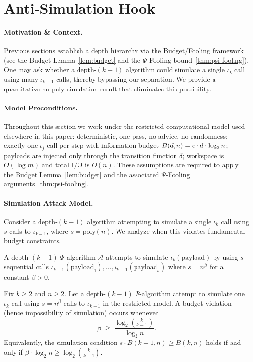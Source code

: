 \section{Anti-Simulation Hook}
\label{AntiSim:sec:hook}

\paragraph{Motivation \& Context.}
Previous sections establish a depth hierarchy via the Budget/Fooling framework (see the Budget Lemma~\ref{lem:budget} and the $\Psi$-Fooling bound~\ref{thm:psi-fooling}). One may ask whether a depth-$(k{-}1)$ algorithm could simulate a single $\iota_k$ call using many $\iota_{k-1}$ calls, thereby bypassing our separation. We provide a quantitative no-poly-simulation result that eliminates this possibility.

\paragraph{Model Preconditions.}
Throughout this section we work under the restricted computational model used elsewhere in this paper:
deterministic, one-pass, no-advice, no-randomness; exactly one $\iota_j$ call per step with information budget $\B(d,n)=c \cdot d \cdot \log_{2} n$; payloads are injected only through the transition function $\delta$; workspace is $O(\log m)$ and total I/O is $O(n)$. These assumptions are required to apply the Budget Lemma~\ref{lem:budget} and the associated $\Psi$-Fooling arguments~\ref{thm:psi-fooling}.

\paragraph{Simulation Attack Model.}
Consider a depth-\((k{-}1)\) algorithm attempting to simulate a single $\iota_k$ call using $s$ calls to $\iota_{k-1}$, where $s = \text{poly}(n)$. We analyze when this violates fundamental budget constraints.

\begin{definition}
\label{AntiSim:def:simulation}
A depth-\((k{-}1)\) $\Psi$-algorithm $\mathcal{A}$ attempts to simulate $\iota_k(\text{payload})$ by using $s$ sequential calls $\iota_{k-1}(\text{payload}_1),\ldots,\iota_{k-1}(\text{payload}_s)$ where $s = n^\beta$ for a constant $\beta > 0$.
\end{definition}

\begin{theorem}
\label{AntiSim:thm:no-poly-sim}
Fix $k \geq 2$ and $n \geq 2$. Let a depth-\((k{-}1)\) $\Psi$-algorithm attempt to simulate one $\iota_k$ call using $s = n^\beta$ calls to $\iota_{k-1}$ in the restricted model. A budget violation (hence impossibility of simulation) occurs whenever
\[
  \beta \;\geq\; \frac{\log_{2}\!\left(\tfrac{k}{k-1}\right)}{\log_{2} n}.
\]
Equivalently, the simulation condition $s\cdot B(k{-}1,n) \geq B(k,n)$ holds if and only if $\beta \cdot \log_{2} n \geq \log_{2}\!\left(\tfrac{k}{k-1}\right)$.
\end{theorem}


